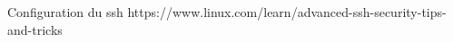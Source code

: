 \nocite{*}
 

Configuration du ssh https://www.linux.com/learn/advanced-ssh-security-tips-and-tricks